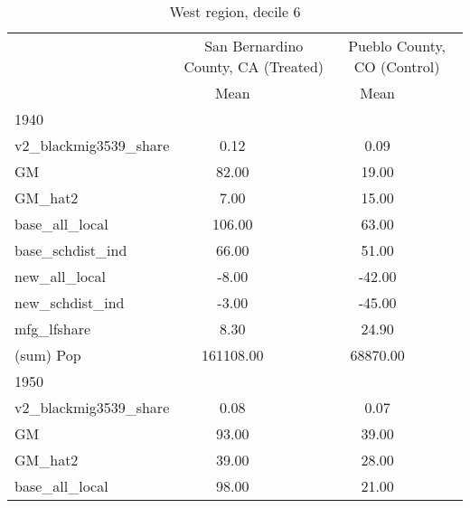 \begin{table}[htbp]\centering
\def\sym#1{\ifmmode^{#1}\else\(^{#1}\)\fi}
\caption{West region, decile 6 \label{tab1}}
\begin{tabular}{l*{2}{ccc}}
\toprule
                    &\multicolumn{3}{c}{San Bernardino County, CA (Treated)}&\multicolumn{3}{c}{Pueblo County, CO (Control)}\\
                    &        Mean&            &            &        Mean&            &            \\
\midrule
1940                &            &            &            &            &            &            \\
v2\_blackmig3539\_share&        0.12&            &            &        0.09&            &            \\
GM                  &       82.00&            &            &       19.00&            &            \\
GM\_hat2             &        7.00&            &            &       15.00&            &            \\
base\_all\_local      &      106.00&            &            &       63.00&            &            \\
base\_schdist\_ind    &       66.00&            &            &       51.00&            &            \\
new\_all\_local       &       -8.00&            &            &      -42.00&            &            \\
new\_schdist\_ind     &       -3.00&            &            &      -45.00&            &            \\
mfg\_lfshare         &        8.30&            &            &       24.90&            &            \\
(sum) Pop           &   161108.00&            &            &    68870.00&            &            \\
\midrule
1950                &            &            &            &            &            &            \\
v2\_blackmig3539\_share&        0.08&            &            &        0.07&            &            \\
GM                  &       93.00&            &            &       39.00&            &            \\
GM\_hat2             &       39.00&            &            &       28.00&            &            \\
base\_all\_local      &       98.00&            &            &       21.00&            &            \\

\end{tabular}
\end{table}
